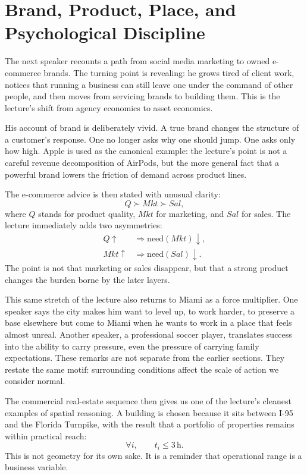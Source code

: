\section{Brand, Product, Place, and Psychological Discipline}

The next speaker recounts a path from social media marketing to owned e-commerce brands. The turning point is revealing: he grows tired of client work, notices that running a business can still leave one under the command of other people, and then moves from servicing brands to building them. This is the lecture's shift from agency economics to asset economics.

His account of brand is deliberately vivid. A true brand changes the structure of a customer's response. One no longer asks why one should jump. One asks only how high. Apple is used as the canonical example: the lecture's point is not a careful revenue decomposition of AirPods, but the more general fact that a powerful brand lowers the friction of demand across product lines.

The e-commerce advice is then stated with unusual clarity:
\begin{equation}
Q \succ Mkt \succ Sal,
\end{equation}
where $Q$ stands for product quality, $Mkt$ for marketing, and $Sal$ for sales. The lecture immediately adds two asymmetries:
\begin{align}
Q \uparrow &\Rightarrow \text{need}(Mkt)\downarrow,\\
Mkt \uparrow &\Rightarrow \text{need}(Sal)\downarrow.
\end{align}
The point is not that marketing or sales disappear, but that a strong product changes the burden borne by the later layers.

This same stretch of the lecture also returns to Miami as a force multiplier. One speaker says the city makes him want to level up, to work harder, to preserve a base elsewhere but come to Miami when he wants to work in a place that feels almost unreal. Another speaker, a professional soccer player, translates success into the ability to carry pressure, even the pressure of carrying family expectations. These remarks are not separate from the earlier sections. They restate the same motif: surrounding conditions affect the scale of action we consider normal.

The commercial real-estate sequence then gives us one of the lecture's cleanest examples of spatial reasoning. A building is chosen because it sits between I-95 and the Florida Turnpike, with the result that a portfolio of properties remains within practical reach:
\begin{equation}
\forall i,\qquad t_i \le 3\,\mathrm{h}.
\end{equation}
This is not geometry for its own sake. It is a reminder that operational range is a business variable.

